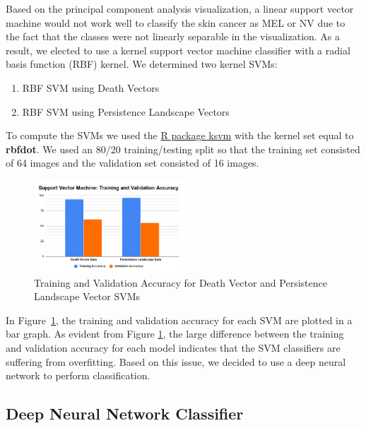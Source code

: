 \documentclass[11pt, reqno]{amsart}
\theoremstyle{plain}
\theoremstyle{definition}
\begin{document}
Based on the principal component analysis visualization, a linear support vector machine would not work well to classify the skin cancer as MEL or NV due to the fact that the classes were not linearly separable in the visualization. As a result, we elected to use a kernel support vector machine classifier with a radial basis function (RBF) kernel. We determined two kernel SVMs:
\begin{enumerate}
    \item RBF SVM using Death Vectors
    \item RBF SVM using Persistence Landscape Vectors
\end{enumerate}
To compute the SVMs we used the \href{https://www.rdocumentation.org/packages/kernlab/versions/0.9-29/topics/ksvm}{R package ksvm} with the kernel set equal to {\bfseries rbfdot}. We used an 80/20 training/testing split so that the training set consisted of 64 images and the validation set consisted of 16 images. 
\begin{figure}[H]
\centering
\includegraphics[width=0.5\textwidth]{SVM-Graph.png}
\caption{Training and Validation Accuracy for Death Vector and Persistence Landscape Vector SVMs}
\label{fig:SVM}
\end{figure}
In Figure~\ref{fig:SVM}, the training and validation accuracy for each SVM are plotted in a bar graph. As evident from Figure \ref{fig:SVM}, the large difference between the training and validation accuracy for each model indicates that the SVM classifiers are suffering from overfitting. Based on this issue, we decided to use a deep neural network to perform classification.

\subsection{Deep Neural Network Classifier}
\end{document}
